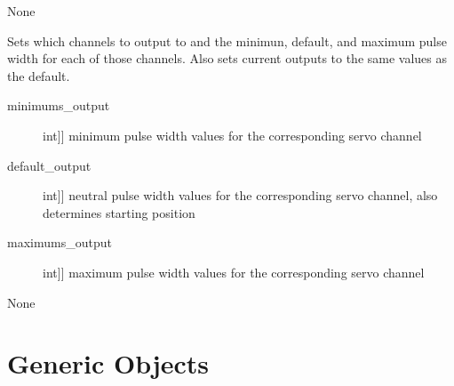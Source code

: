 \documentclass[letterpaper,10pt,english]{sphinxmanual}
\begin{document}
\begin{fulllineitems}
\begin{fulllineitems}
\begin{description}
\end{description}

\sphinxAtStartPar
{}

\sphinxAtStartPar
None

\end{fulllineitems}


\begin{fulllineitems}
\label{\detokenize{base:MultiInputOutputObject.MultiInputOutputObject.set_outputs}}
\sphinxAtStartPar
Sets which channels to output to and the minimun, default, and maximum pulse width for each of those channels.
Also sets current outputs to the same values as the default.

\sphinxAtStartPar
{}
\begin{description}
\item[{minimums\_output}] \leavevmode{[}{[}int{]}{]}
\sphinxAtStartPar
minimum pulse width values for the corresponding servo channel

\item[{default\_output}] \leavevmode{[}{[}int{]}{]}
\sphinxAtStartPar
neutral pulse width values for the corresponding servo channel, also determines starting position

\item[{maximums\_output}] \leavevmode{[}{[}int{]}{]}
\sphinxAtStartPar
maximum pulse width values for the corresponding servo channel

\end{description}

\sphinxAtStartPar
{}

\sphinxAtStartPar
None

\end{fulllineitems}


\end{fulllineitems}



\section{Generic Objects}
\label{\detokenize{generic:generic-objects}}\label{\detokenize{generic::doc}}
\end{document}
